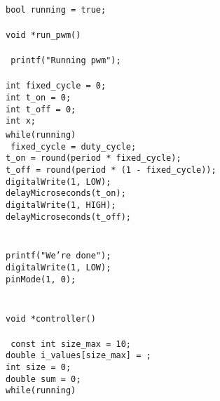 \documentclass[a4paper, 12pt]{article}
\begin{document}
\begin{appendices}
	\texttt{ \\\noindent}
	\texttt{bool running = true;} \\\noindent
	\texttt{ \\\noindent}
	\texttt{void *run\_pwm()} \\\noindent
	\texttt{{ \\\noindent}
	\texttt{printf("Running pwm\n");} \\\noindent
	\texttt{ \\\noindent}
	\texttt{int fixed\_cycle = 0;} \\\noindent
	\texttt{int t\_on = 0;} \\\noindent
	\texttt{int t\_off = 0;} \\\noindent
	\texttt{int x;} \\\noindent
	\texttt{while(running){ \\\noindent}
	\texttt{fixed\_cycle = duty\_cycle;} \\\noindent
	\texttt{t\_on = round(period * fixed\_cycle);} \\\noindent
	\texttt{t\_off = round(period * (1 - fixed\_cycle));} \\\noindent
	\texttt{digitalWrite(1, LOW);} \\\noindent
	\texttt{delayMicroseconds(t\_on);} \\\noindent
	\texttt{digitalWrite(1, HIGH);} \\\noindent
	\texttt{delayMicroseconds(t\_off);} \\\noindent
	\texttt{}} \\\noindent
	\texttt{} \\\noindent
	\texttt{printf("We're done\n");} \\\noindent
	\texttt{digitalWrite(1, LOW);} \\\noindent
	\texttt{pinMode(1, 0);} \\\noindent
	\texttt{}} \\\noindent
	\texttt{ \\\noindent}
	\texttt{void *controller()} \\\noindent
	\texttt{{ \\\noindent}
	\texttt{const int size\_max = 10;} \\\noindent
	\texttt{double i\_values[size\_max] = {};} \\\noindent
	\texttt{int size = 0;} \\\noindent
	\texttt{double sum = 0;} \\\noindent
	\texttt{while(running)} \\\noindent
	\texttt{{ \\\noindent}
}}
\end{appendices}
\end{document}
